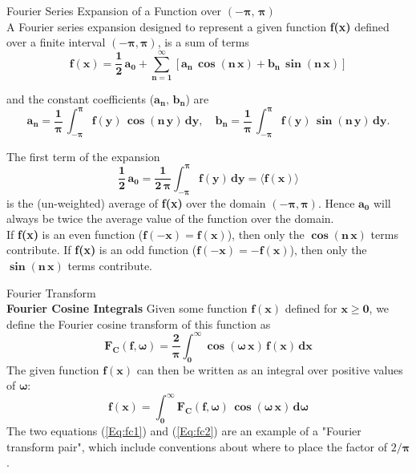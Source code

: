 \begin{compactitem}

\item {Fourier Series Expansion of a Function over $(-\boldsymbol{\pi,\,\pi})$}\\
A Fourier series expansion designed to represent a given function
  \textbf{f(x)} defined over a finite interval $(-\boldsymbol{\pi, \pi})$, is a sum of terms
\begin{equation}  \label{fxpi}
\mathbf{f(x) = \frac{1}{2} \, a_{0} + \sum_{n=1}^{\infty} \left[
   a_{n}\,\boldsymbol{\cos} (n\,x) + b_{n} \,\boldsymbol{\sin} (n\,x) \right] }
\end{equation}

\noindent and the constant coefficients ($\mathbf{a_{n},\, b_{n}}$) are
\begin{equation} \label{fcoeff}
 \mathbf{ a_{n} = \frac{1}{\boldsymbol{\pi}} \, \int_{-\boldsymbol{\pi}}^{\boldsymbol{\pi}} f(y)\,
   \boldsymbol{\cos} (n\,y) \, dy}, \quad
   \mathbf{ b_{n} = \frac{1}{\boldsymbol{\pi}} \, \int_{-\boldsymbol{\pi}}^{\boldsymbol{\pi}} f(y)\,
   \boldsymbol{\sin} (n\,y) \, dy}.
\end{equation}

\noindent The first term of the expansion
\begin{equation}
\mathbf{ \frac{1}{2} \, a_0  =
 \frac{1}{2\, \boldsymbol{\pi}}  \int_{-\boldsymbol{\pi}}^{\boldsymbol{\pi}} f(y)\,dy =
 \langle f(x) \rangle }
\end{equation}
is the (un-weighted) average of \textbf{f(x)} over the domain $(-\boldsymbol{\pi},\boldsymbol{\pi})$.
Hence $\mathbf{a_{0}}$ will always be twice the average value of the function over
  the domain.\\

\noindent If \textbf{f(x)} is an even function ($\mathbf{f(-x) =  f(x)}$),
  then only the $\mathbf{\boldsymbol{\cos}(n\,x)}$ terms
  contribute.
If \textbf{f(x)} is an odd function ($\mathbf{f(-x) =  -f(x)}$),
  then only the $\mathbf{\boldsymbol{\sin}(n\,x)}$ terms contribute. \\


\item {Fourier Transform}\\
\textbf{Fourier Cosine Integrals}
Given some function $\mathbf{f(x)}$ defined for $\mathbf{x \geq 0}$,
  we define the Fourier cosine transform  of this function as
\begin{equation}  \label{Eq:fc1}
\mathbf{F_{C}(f,\boldsymbol{\omega}) = \frac{2}{\boldsymbol{\pi}}
  \int_{0}^{\infty} \boldsymbol{\cos}(\boldsymbol{\omega}\,x)\,f(x)\,dx }
\end{equation}
The given function $\mathbf{f(x)}$ can then be written as an integral
  over positive values of $\boldsymbol{\omega}$:
\begin{equation}  \label{Eq:fc2}
\mathbf{f(x) = \int_{0}^{\infty} F_{C}(f,\boldsymbol{\omega})\,
    \cos(\boldsymbol{\omega}\,x)\,d\boldsymbol{\omega} }
\end{equation}
The two equations (\ref{Eq:fc1}) and (\ref{Eq:fc2}) are an example of
  a "Fourier transform pair", which include conventions about where
  to place the factor of $2/\boldsymbol{\pi}$.\\


\end{compactitem}
